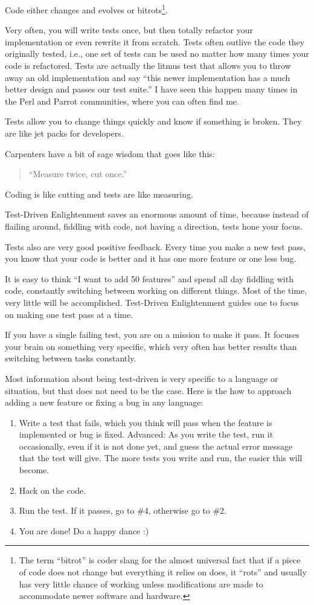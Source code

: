 Code either changes and evolves or bitrots\footnote{The term ``bitrot'' is coder
slang for the almost universal fact that if a piece of code does not change but
everything it relies on does, it ``rots'' and usually has very little chance of
working unless modifications are made to accommodate newer software and
hardware.}.

Very often, you will write tests once, but then totally refactor your
implementation or even rewrite it from scratch. Tests often outlive the code
they originally tested, i.e., one set of tests can be used no matter how many
times your code is refactored. Tests are actually the litmus test that allows you to throw away an old implementation and say ``this newer implementation has a much better design and passes our test suite.'' I have seen this happen many
times in the Perl and Parrot communities, where you can often find me.

Tests allow you to change things quickly and know if something is broken. They
are like jet packs for developers.

Carpenters have a bit of sage wisdom that goes like this:
\begin{quote}``Measure twice, cut once.''\end{quote} 

Coding is like cutting and tests are like measuring.

Test-Driven Enlightenment saves an enormous amount of time, because instead of
flailing around, fiddling with code, not having a direction, tests hone your
focus.

Tests also are very good positive feedback. Every time you make a new test pass,
you know that your code is better and it has one more feature or one less bug.

It is easy to think ``I want to add 50 features'' and spend all day fiddling
with code, constantly switching between working on different things. Most of the
time, very little will be accomplished. Test-Driven Enlightenment guides one to
focus on making one test pass at a time.

If you have a single failing test, you are on a mission to make it pass. It focuses
your brain on something very specific, which very often has better results than
switching between tasks constantly.

Most information about being test-driven is very specific to a language or
situation, but that does not need to be the case. Here is the how to approach
adding a new feature or fixing a bug in any language:
\begin{enumerate}
 \item Write a test that fails, which you think will pass when the feature is
implemented or bug is fixed. Advanced: As you write the test, run it
occasionally, even if it is not done yet, and guess the actual error message
that the test will give. The more tests you write and run, the easier this will
become.
 \item Hack on the code.
 \item Run the test. If it passes, go to \#4, otherwise go to \#2.
 \item You are done! Do a happy dance :)
\end{enumerate}

